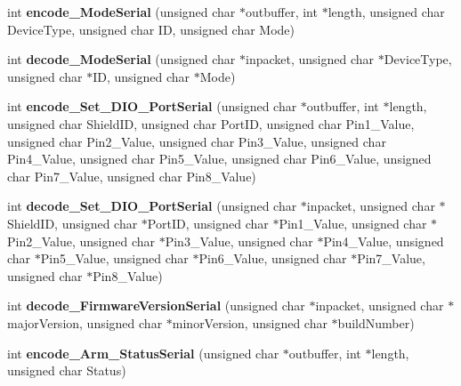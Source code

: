 \begin{DoxyCompactItemize}
\item 
\mbox{\label{classSerialMessageHandler_ac3800e211e50b3f4e88c7d77457964d9}} 
int {\bfseries encode\+\_\+\+Mode\+Serial} (unsigned char $\ast$outbuffer, int $\ast$length, unsigned char Device\+Type, unsigned char ID, unsigned char Mode)
\item 
\mbox{\label{classSerialMessageHandler_a5fb4f2a15c3a0eb8a49d6cbcec259c3d}} 
int {\bfseries decode\+\_\+\+Mode\+Serial} (unsigned char $\ast$inpacket, unsigned char $\ast$Device\+Type, unsigned char $\ast$ID, unsigned char $\ast$Mode)
\item 
\mbox{\label{classSerialMessageHandler_a62418e263b6d368e1309faba04717dc1}} 
int {\bfseries encode\+\_\+\+Set\+\_\+\+D\+I\+O\+\_\+\+Port\+Serial} (unsigned char $\ast$outbuffer, int $\ast$length, unsigned char Shield\+ID, unsigned char Port\+ID, unsigned char Pin1\+\_\+\+Value, unsigned char Pin2\+\_\+\+Value, unsigned char Pin3\+\_\+\+Value, unsigned char Pin4\+\_\+\+Value, unsigned char Pin5\+\_\+\+Value, unsigned char Pin6\+\_\+\+Value, unsigned char Pin7\+\_\+\+Value, unsigned char Pin8\+\_\+\+Value)
\item 
\mbox{\label{classSerialMessageHandler_ab6d5debd538b8dc45b44bf1cdafbe29a}} 
int {\bfseries decode\+\_\+\+Set\+\_\+\+D\+I\+O\+\_\+\+Port\+Serial} (unsigned char $\ast$inpacket, unsigned char $\ast$Shield\+ID, unsigned char $\ast$Port\+ID, unsigned char $\ast$Pin1\+\_\+\+Value, unsigned char $\ast$Pin2\+\_\+\+Value, unsigned char $\ast$Pin3\+\_\+\+Value, unsigned char $\ast$Pin4\+\_\+\+Value, unsigned char $\ast$Pin5\+\_\+\+Value, unsigned char $\ast$Pin6\+\_\+\+Value, unsigned char $\ast$Pin7\+\_\+\+Value, unsigned char $\ast$Pin8\+\_\+\+Value)
\item 
\mbox{\label{classSerialMessageHandler_abbf60056ee29672bd8ab635eb7d75e8f}} 
int {\bfseries decode\+\_\+\+Firmware\+Version\+Serial} (unsigned char $\ast$inpacket, unsigned char $\ast$major\+Version, unsigned char $\ast$minor\+Version, unsigned char $\ast$build\+Number)
\item 
\mbox{\label{classSerialMessageHandler_a2aa01802400a0c45ca4079bb76f8d455}} 
int {\bfseries encode\+\_\+\+Arm\+\_\+\+Status\+Serial} (unsigned char $\ast$outbuffer, int $\ast$length, unsigned char Status)

\end{DoxyCompactItemize}
